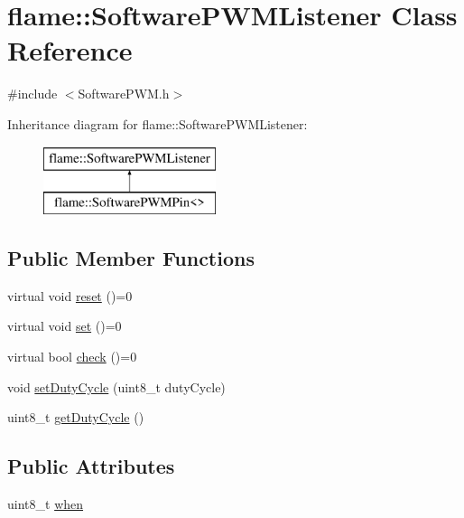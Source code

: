 \hypertarget{classflame_1_1_software_p_w_m_listener}{\section{flame\-:\-:Software\-P\-W\-M\-Listener Class Reference}
\label{classflame_1_1_software_p_w_m_listener}
}


{\ttfamily \#include $<$Software\-P\-W\-M.\-h$>$}

Inheritance diagram for flame\-:\-:Software\-P\-W\-M\-Listener\-:\begin{figure}[H]
\begin{center}
\leavevmode
\includegraphics[height=2.000000cm]{classflame_1_1_software_p_w_m_listener}
\end{center}
\end{figure}
\subsection*{Public Member Functions}
\begin{DoxyCompactItemize}
\item 
virtual void \hyperlink{classflame_1_1_software_p_w_m_listener_a4d8db257cb0f4cbcba16a8986416ca6a}{reset} ()=0
\item 
virtual void \hyperlink{classflame_1_1_software_p_w_m_listener_af08c4eb71ac1d22d479a4c2bdce0fe12}{set} ()=0
\item 
virtual bool \hyperlink{classflame_1_1_software_p_w_m_listener_a2e8a39faa1f233483720a516397df545}{check} ()=0
\item 
void \hyperlink{classflame_1_1_software_p_w_m_listener_a82d1d2dcb7d0dd19278469554673dc7b}{set\-Duty\-Cycle} (uint8\-\_\-t duty\-Cycle)
\item 
uint8\-\_\-t \hyperlink{classflame_1_1_software_p_w_m_listener_a497cc44fbc87e08bcae5230298a78461}{get\-Duty\-Cycle} ()
\end{DoxyCompactItemize}
\subsection*{Public Attributes}
\begin{DoxyCompactItemize}
\item 
uint8\-\_\-t \hyperlink{classflame_1_1_software_p_w_m_listener_a0f8297e9d8ac43c30c02585bf1e220b1}{when}
\end{DoxyCompactItemize}


